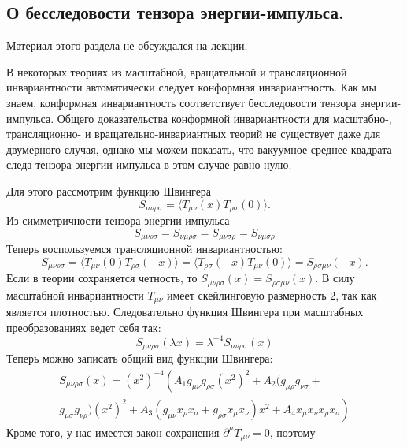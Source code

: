\documentclass[a4paper,12pt]{article} \usepackage[utf8x]{inputenc} \usepackage[russian]{babel}
\theoremstyle{definition} \newtheorem{corollary}{Corollary}[theorem] \theoremstyle{definition}
\begin{document}
\subsection{О бесследовости тензора энергии-импульса.}
\label{sec:tracelessness} Материал этого раздела не обсуждался на лекции.

В некоторых теориях из масштабной, вращательной и трансляционной инвариантности автоматически
следует конформная инвариантность. Как мы знаем, конформная инвариантность соответствует
бесследовости тензора энергии-импульса. Общего доказательства конформной инвариантности для
масштабно-, трансляционно- и вращательно-инвариантных теорий не существует даже для двумерного
случая, однако мы можем показать, что вакуумное среднее квадрата следа тензора энергии-импульса в
этом случае равно нулю.

Для этого рассмотрим функцию Швингера
\begin{equation}
  \label{eq:214} S_{\mu\nu\rho\sigma}=\langle T_{\mu\nu}(x) T_{\rho\sigma}(0)\rangle.
\end{equation} Из симметричности тензора энергии-импульса
\begin{equation}
  \label{eq:215} S_{\mu\nu\rho\sigma}=S_{\nu\mu\rho\sigma}=S_{\mu\nu\sigma\rho}=S_{\nu\mu\sigma\rho}
\end{equation} Теперь воспользуемся трансляционной инвариантностью:
\begin{equation}
  \label{eq:216} S_{\mu\nu\rho\sigma}=\langle T_{\mu\nu}(0)T_{\rho\sigma}(-x)\rangle =\langle
T_{\rho\sigma}(-x) T_{\mu\nu}(0)\rangle = S_{\rho\sigma\mu\nu}(-x).
\end{equation} Если в теории сохраняется четность, то
$S_{\mu\nu\rho\sigma}(x)=S_{\rho\sigma\mu\nu}(x)$. В силу масштабной инвариантности $T_{\mu\nu}$
имеет скейлинговую размерность 2, так как является плотностью. Следовательно функция Швингера при
масштабных преобразованиях ведет себя так:
\begin{equation}
  \label{eq:217} S_{\mu\nu\rho\sigma}(\lambda x)=\lambda^{-4} S_{\mu\nu\rho\sigma}(x)
\end{equation} Теперь можно записать общий вид функции Швингера:
\begin{multline}
  \label{eq:218} S_{\mu\nu\rho\sigma}(x)=(x^{2})^{-4} \left( A_{1}g_{\mu\nu} g_{\rho\sigma}
(x^{2})^{2} + A_{2} (g_{\mu\rho}g_{\nu\sigma}\right. +\\ \left. g_{\mu\sigma}g_{\nu\rho})
(x^{2})^{2} +A_{3} (g_{\mu\nu} x_{\rho}x_{\sigma} +g_{\rho\sigma}x_{\mu}x_{\nu})x^{2} +A_{4}
x_{\mu}x_{\nu}x_{\rho}x_{\sigma}\right)
\end{multline} Кроме того, у нас имеется закон сохранения $\partial^{\mu} T_{\mu\nu}=0$, поэтому
\end{document}
